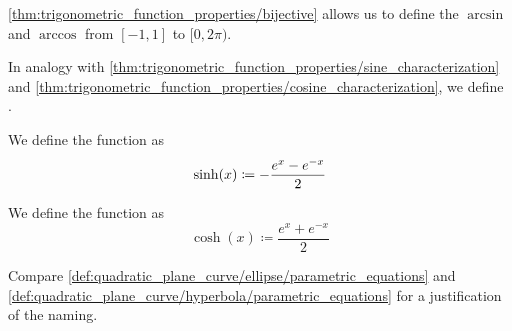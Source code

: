 \begin{definition}\label{def:inverse_trigonometric_functions}
  \cref{thm:trigonometric_function_properties/bijective} allows us to define the  \( \arcsin \) and \( \arccos \) from \( [-1, 1] \) to \( [0, 2\pi) \).
\end{definition}

\begin{definition}\label{def:hyperbolic_trigonometric_functions}
  In analogy with \cref{thm:trigonometric_function_properties/sine_characterization} and \cref{thm:trigonometric_function_properties/cosine_characterization}, we define .

  \begin{defenum}
     We define the  function as
    \begin{equation*}
      \sinh(x) \coloneqq - \frac {e^x - e^{-x}} 2 \\
    \end{equation*}

     We define the  function as
    \begin{equation*}
      \cosh(x) \coloneqq \frac {e^x + e^{-x}} 2
    \end{equation*}
  \end{defenum}

  Compare \cref{def:quadratic_plane_curve/ellipse/parametric_equations} and \cref{def:quadratic_plane_curve/hyperbola/parametric_equations} for a justification of the naming.
\end{definition}
